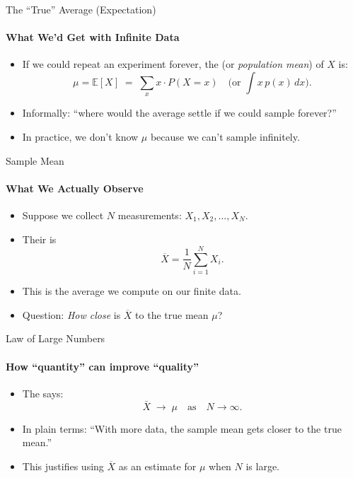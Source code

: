 \begin{frame}{The ``True'' Average (Expectation)}
  \framesubtitle{What We'd Get with Infinite Data}
  \begin{itemize}
    \item If we could repeat an experiment forever, the  (or \emph{population mean}) of $X$ is:
          \[
            \mu = \mathbb{E}[X] \;=\; \sum_x x\cdot P(X=x)
            \quad\bigl(\text{or } \int x\,p(x)\,dx\bigr).
          \]
    \item Informally: “where would the average settle if we could sample forever?”
    \item In practice, we don't know $\mu$ because we can't sample infinitely.
  \end{itemize}
\end{frame}

\begin{frame}{Sample Mean}
  \framesubtitle{What We Actually Observe}
  \begin{itemize}
    \item Suppose we collect $N$ measurements: $X_1, X_2, \dots, X_N$.
    \item Their  is
          \[
            \overline{X} = \frac{1}{N}\sum_{i=1}^N X_i.
          \]
    \item This is the average we compute on our finite data.
    \item Question: \emph{How close} is $\overline{X}$ to the true mean $\mu$?
  \end{itemize}
\end{frame}

\begin{frame}{Law of Large Numbers}
  \framesubtitle{How ``quantity'' can improve ``quality''}
  \begin{itemize}
    \item The  says:
          \[
            \bar X \;\to\; \mu
            \quad\text{as}\quad N\to\infty.
          \]
    \item In plain terms: “With more data, the sample mean gets closer to the true mean.”
    \item This justifies using $\overline{X}$ as an estimate for $\mu$ when $N$ is large.
  \end{itemize}
\end{frame}

